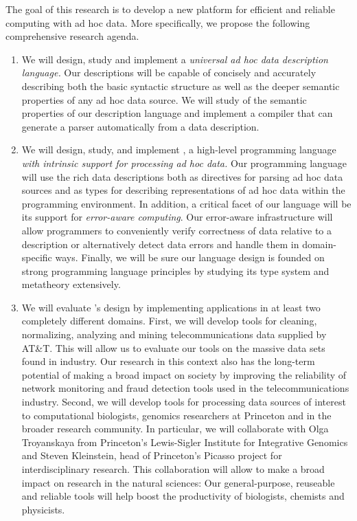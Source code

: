 \documentclass[11pt]{article}
\begin{document}
The goal of this research is to develop a new platform for
efficient and reliable computing with ad hoc data.
More specifically, we propose the following comprehensive 
research agenda.

\begin{enumerate}
\item We will design, study and implement
a {\em universal ad hoc data description language.}
Our descriptions will be capable of
concisely and accurately describing both the basic syntactic structure
as well as the deeper semantic properties of any ad hoc data source.
We will study of the semantic properties of our description language
and implement a compiler that can
generate a parser automatically from a data description.

\item We will design, study, and implement  \datatype{}, a 
high-level programming language {\em with 
intrinsic support for 
processing ad hoc data.}  Our programming language will use the
rich data descriptions both as directives for
parsing ad hoc data sources and as types for describing
representations of ad hoc data within the programming environment.  
In addition,
a critical facet of our language will be its support for
{\em error-aware computing}.  Our error-aware infrastructure 
will allow programmers to conveniently
verify correctness of data relative to a description or 
alternatively detect data errors and handle them in domain-specific
ways.  Finally, we will be sure
our language design is founded on
strong programming language principles by
studying its type system and metatheory extensively. 

\item We will evaluate \datatype's design by implementing 
applications in at least two completely different domains.  First, we will
develop tools for cleaning, normalizing, analyzing and mining
telecommunications data supplied by AT\&T.  This will allow
us to evaluate our tools on the massive data sets found in
industry.  Our research in this context also has the 
long-term potential of making
a broad impact on society by improving the reliability of network
monitoring and fraud detection tools
used in the telecommunications industry.  Second, we 
will develop tools for processing data sources of 
interest to computational biologists, genomics researchers 
at Princeton and in the
broader research community.  In particular, we will collaborate with
Olga Troyanskaya from Princeton's Lewis-Sigler Institute for 
Integrative Genomics and Steven Kleinstein, head of Princeton's
Picasso project for interdisciplinary research.
This collaboration will allow to make a broad impact on
research in the natural sciences:  Our general-purpose, reuseable
and reliable tools will help boost the productivity of biologists, 
chemists and physicists.


\end{enumerate}
\end{document}
